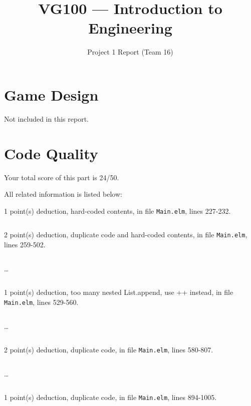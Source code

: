 \documentclass{article}
\title{VG100 --- Introduction to\\ Engineering}
\subtitle{Project 1 Report (Team 16)}
\begin{document}
\maketitle

\section{Game Design}

Not included in this report.

\section{Code Quality}

Your total score of this part is 24/50. \medskip

All related information is listed below: \medskip

1 point(s) {\color{red}deduction}, hard-coded contents, in file {\color{blue}\texttt{Main.elm}}, lines {\color{blue}227-232}.

\inputminted[firstline=227,lastline=232]{elm}{Main.elm}

2 point(s) {\color{red}deduction}, duplicate code and hard-coded contents, in file {\color{blue}\texttt{Main.elm}}, lines {\color{blue}259-502}.

\inputminted[firstline=259,lastline=268]{elm}{Main.elm}

\dots

\inputminted[firstline=493,lastline=502]{elm}{Main.elm}

1 point(s) {\color{red}deduction}, too many nested List.append, use ++ instead, in file {\color{blue}\texttt{Main.elm}}, lines {\color{blue}529-560}.

\inputminted[firstline=529,lastline=538]{elm}{Main.elm}

\dots

\inputminted[firstline=551,lastline=560]{elm}{Main.elm}

2 point(s) {\color{red}deduction}, duplicate code, in file {\color{blue}\texttt{Main.elm}}, lines {\color{blue}580-807}.

\inputminted[firstline=580,lastline=589]{elm}{Main.elm}

\dots

\inputminted[firstline=798,lastline=807]{elm}{Main.elm}

1 point(s) {\color{red}deduction}, duplicate code, in file {\color{blue}\texttt{Main.elm}}, lines {\color{blue}894-1005}.

\inputminted[firstline=894,lastline=903]{elm}{Main.elm}
\end{document}
